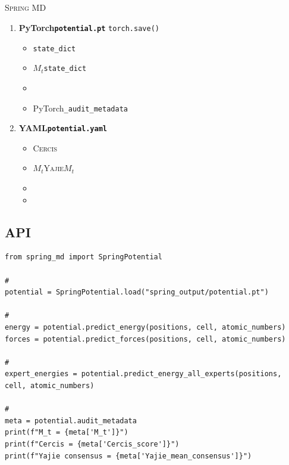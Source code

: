 \documentclass[12pt,a4paper]{article}
\theoremstyle{remark}
\newcommand{\Yajie}{\textsc{Yajie}}
\newcommand{\Cercis}{\textsc{Cercis}}
\newcommand{\SpringMD}{\textsc{Spring MD}}
\begin{document}
\subsection{}

\SpringMD{}

\begin{enumerate}[label=(\arabic*),itemsep=4pt]
    \item \textbf{PyTorch\texttt{potential.pt}}
    \texttt{torch.save()}
    \begin{itemize}[nosep]
        \item \texttt{state\_dict}
        \item $M_t$\texttt{state\_dict}
        \item 
        \item PyTorch\texttt{\_audit\_metadata}
    \end{itemize}

    \item \textbf{YAML\texttt{potential.yaml}}
    
    \begin{itemize}[nosep]
        \item \Cercis{}
        \item $M_t$\Yajie{}$M_t$
        \item 
        \item 
    \end{itemize}
\end{enumerate}

\subsection{API}

\begin{lstlisting}[caption={Python API},label=lst:api_load]
from spring_md import SpringPotential

# 
potential = SpringPotential.load("spring_output/potential.pt")

# 
energy = potential.predict_energy(positions, cell, atomic_numbers)
forces = potential.predict_forces(positions, cell, atomic_numbers)

# 
expert_energies = potential.predict_energy_all_experts(positions, cell, atomic_numbers)

# 
meta = potential.audit_metadata
print(f"M_t = {meta['M_t']}")
print(f"Cercis = {meta['Cercis_score']}")
print(f"Yajie consensus = {meta['Yajie_mean_consensus']}")
\end{lstlisting}
\end{document}
